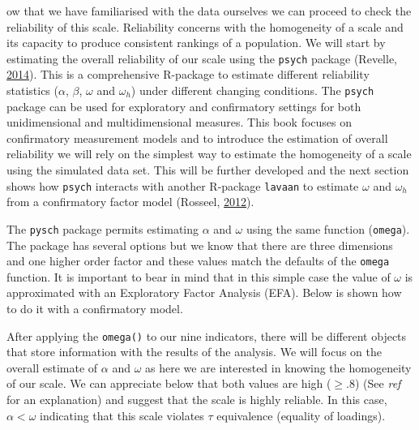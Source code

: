 \documentclass[]{book}
\newenvironment{Shaded}{\begin{snugshade}}{\end{snugshade}}
\newcommand{\CommentTok}[1]{\textcolor[rgb]{0.56,0.35,0.01}{\textit{#1}}}
\newcommand{\DataTypeTok}[1]{\textcolor[rgb]{0.13,0.29,0.53}{#1}}
\newcommand{\DecValTok}[1]{\textcolor[rgb]{0.00,0.00,0.81}{#1}}
\newcommand{\KeywordTok}[1]{\textcolor[rgb]{0.13,0.29,0.53}{\textbf{#1}}}
\newcommand{\NormalTok}[1]{#1}
\newcommand{\OperatorTok}[1]{\textcolor[rgb]{0.81,0.36,0.00}{\textbf{#1}}}
\begin{document}
ow that we have familiarised with the data ourselves we can proceed to check the reliability of this scale. Reliability concerns with the homogeneity of a scale and its capacity to produce consistent rankings of a population. We will start by estimating the overall reliability of our scale using the \texttt{psych} package (Revelle, \protect\hyperlink{ref-Revelle2014}{2014}). This is a comprehensive R-package to estimate different reliability statistics (\(\alpha\), \(\beta\), \(\omega\) and \(\omega_h\)) under different changing conditions. The \texttt{psych} package can be used for exploratory and confirmatory settings for both unidimensional and multidimensional measures. This book focuses on confirmatory measurement models and to introduce the estimation of overall reliability we will rely on the simplest way to estimate the homogeneity of a scale using the simulated data set. This will be further developed and the next section shows how \texttt{psych} interacts with another R-package \texttt{lavaan} to estimate \(\omega\) and \(\omega_h\) from a confirmatory factor model (Rosseel, \protect\hyperlink{ref-Rosseel2012}{2012}).

The \texttt{pysch} package permits estimating \(\alpha\) and \(\omega\) using the same function (\texttt{omega}). The package has several options but we know that there are three dimensions and one higher order factor and these values match the defaults of the \texttt{omega} function. It is important to bear in mind that in this simple case the value of \(\omega\) is approximated with an Exploratory Factor Analysis (EFA). Below is shown how to do it with a confirmatory model.

After applying the \texttt{omega()} to our nine indicators, there will be different objects that store information with the results of the analysis. We will focus on the overall estimate of \(\alpha\) and \(\omega\) as here we are interested in knowing the homogeneity of our scale. We can appreciate below that both values are high (\(\geq.8\)) (See \emph{ref} for an explanation) and suggest that the scale is highly reliable. In this case, \(\alpha<\omega\) indicating that this scale violates \(\tau\) equivalence (equality of loadings).

\begin{Shaded}
\end{Shaded}
\end{document}
